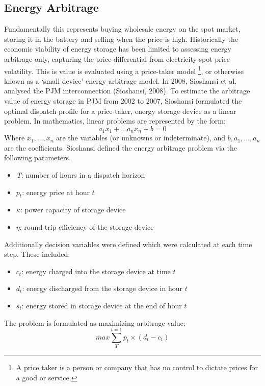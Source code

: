 \subsection{ Energy Arbitrage }
\label{sec:background_energyarb}
 Fundamentally this represents buying wholesale energy on the spot market, storing it in the battery and selling when the price is high. Historically the economic viability of energy storage has been limited to assessing energy arbitrage only, capturing the price differential from electricity spot price volatility. This is value is evaluated using a price-taker model \footnote{A price taker is a person or company that has no control to dictate prices for a good or service.}, or otherwise known as a `small device' energy arbitrage model. In 2008, Sioshansi et al. analysed the PJM interconnection (Sioshansi, 2008). To estimate the arbitrage value of energy storage in PJM from 2002 to 2007, Sioshansi formulated the optimal dispatch profile for a price-taker, energy storage device as a linear problem. In mathematics, linear problems are represented by the form: 
\begin{equation}
    a_1 x_1 + ... a_n x_n + b = 0
\end{equation}
Where ${\displaystyle x_{1},\ldots ,x_{n}}$ are the variables (or unknowns or indeterminate), and ${\displaystyle b, a_{1},\ldots ,a_{n}}$ are the coefficients. Sioshansi defined the energy arbitrage problem via the following parameters. 
\begin{itemize}
    \item \textit{T}: number of hours in a dispatch horizon
    \item \textit{$p_t$}: energy price at hour $t$ 
    \item $\kappa$: power capacity of storage device
    \item $\eta$: round-trip efficiency of the storage device 
\end{itemize}
Additionally decision variables were defined which were calculated at each time step. These included: 
\begin{itemize}
    \item $c_t$: energy charged into the storage device at time $t$
    \item $d_t$: energy discharged from the storage device in hour $t$
    \item $s_t$: energy stored in storage device at the end of hour $t$
\end{itemize}
The problem is formulated as maximizing arbitrage value:
\begin{equation}
    max \sum_{T}^{t=1}p_t \times (d_t - c_t)
\end{equation}

